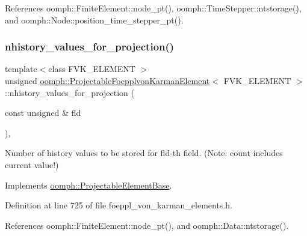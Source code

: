 References oomph\+::\+Finite\+Element\+::node\+\_\+pt(), oomph\+::\+Time\+Stepper\+::ntstorage(), and oomph\+::\+Node\+::position\+\_\+time\+\_\+stepper\+\_\+pt().

\mbox{\label{classoomph_1_1ProjectableFoepplvonKarmanElement_afbac2a4519a482c9a7fdc9994e783147}} 
\subsubsection{\texorpdfstring{nhistory\+\_\+values\+\_\+for\+\_\+projection()}{nhistory\_values\_for\_projection()}}
{\footnotesize\ttfamily template$<$class F\+V\+K\+\_\+\+E\+L\+E\+M\+E\+NT $>$ \\
unsigned \hyperlink{classoomph_1_1ProjectableFoepplvonKarmanElement}{oomph\+::\+Projectable\+Foepplvon\+Karman\+Element}$<$ F\+V\+K\+\_\+\+E\+L\+E\+M\+E\+NT $>$\+::nhistory\+\_\+values\+\_\+for\+\_\+projection (\begin{DoxyParamCaption}\item[{const unsigned \&}]{fld }\end{DoxyParamCaption})\hspace{0.3cm}{\ttfamily [inline]}, {\ttfamily [virtual]}}



Number of history values to be stored for fld-\/th field. (Note\+: count includes current value!) 



Implements \hyperlink{classoomph_1_1ProjectableElementBase_ac6790f394630b964663281f8740f43a5}{oomph\+::\+Projectable\+Element\+Base}.



Definition at line 725 of file foeppl\+\_\+von\+\_\+karman\+\_\+elements.\+h.



References oomph\+::\+Finite\+Element\+::node\+\_\+pt(), and oomph\+::\+Data\+::ntstorage().

\mbox{\label{classoomph_1_1ProjectableFoepplvonKarmanElement_aef446291cf0c740bc541b770a194d29f}} 
